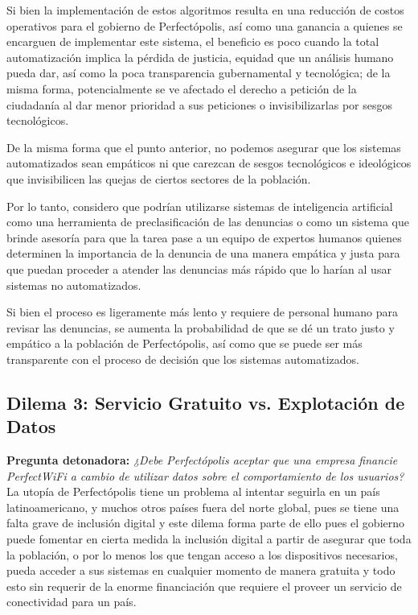 Si bien la implementación de estos algoritmos resulta en una reducción de costos operativos para el gobierno de Perfectópolis, así como una ganancia a quienes se encarguen de implementar este sistema, el beneficio es poco cuando la total automatización implica la pérdida de justicia, equidad que un análisis humano pueda dar, así como la poca transparencia gubernamental y tecnológica; de la misma forma, potencialmente se ve afectado el derecho a petición de la ciudadanía al dar menor prioridad a sus peticiones o invisibilizarlas por sesgos tecnológicos. 

De la misma forma que el punto anterior, no podemos asegurar que los sistemas automatizados sean empáticos ni que carezcan de sesgos tecnológicos e ideológicos que invisibilicen las quejas de ciertos sectores de la población.

Por lo tanto, considero que podrían utilizarse sistemas de inteligencia artificial como una herramienta de preclasificación de las denuncias o como un sistema que brinde asesoría para que la tarea pase a un equipo de expertos humanos quienes determinen la importancia de la denuncia de una manera empática y justa para que puedan proceder a atender las denuncias más rápido que lo harían al usar sistemas no automatizados.

Si bien el proceso es ligeramente más lento y requiere de personal humano para revisar las denuncias, se aumenta la probabilidad de que se dé un trato justo y empático a la población de Perfectópolis, así como que se puede ser más transparente con el proceso de decisión que los sistemas automatizados.
\subsection*{Dilema 3: Servicio Gratuito vs. Explotación de Datos}
\textbf{Pregunta detonadora:} \textit{¿Debe Perfectópolis aceptar que una empresa financie PerfectWiFi a cambio de utilizar datos sobre el comportamiento de los usuarios?}\\[2mm]
La utopía de Perfectópolis tiene un problema al intentar seguirla en un país latinoamericano, y muchos otros países fuera del norte global, pues se tiene una falta grave de inclusión digital y este dilema forma parte de ello pues el gobierno puede fomentar en cierta medida la inclusión digital a partir de asegurar que toda la población, o por lo menos los que tengan acceso a los dispositivos necesarios, pueda acceder a sus sistemas en cualquier momento de manera gratuita y todo esto sin requerir de la enorme financiación que requiere el proveer un servicio de conectividad para un país.

